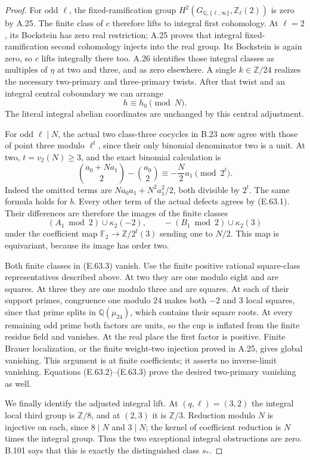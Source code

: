 \begin{proof}
For odd $\ell$, the fixed-ramification
group $H^2(G_{\mathbb Q,\{\ell,\infty\}},
\mathbb Z_\ell(2))$ is zero by A.25.
The finite class of $c$ therefore lifts
to integral first cohomology.
At $\ell=2$, its Bockstein has zero
real restriction; A.25 proves that
integral fixed-ramification second
cohomology injects into the real group.
Its Bockstein is again zero, so $c$
lifts integrally there too.
A.26 identifies those integral classes
as multiples of $\eta$ at two and three,
and as zero elsewhere. A single
$k\in\mathbb Z/24$ realizes the necessary
two-primary and three-primary twists.
After that twist and an integral central
coboundary we can arrange
\[
                        h\equiv h_0\pmod N .
 \tag{E.63.1}
\]
The literal integral abelian coordinates
are unchanged by this central adjustment.

For odd $\ell\mid N$, the actual two
class-three cocycles in B.23 now agree
with those of point three modulo
$\ell^t$, since their only binomial
denominator two is a unit.
At two, $t=v_2(N)\geq3$, and the exact
binomial calculation is
\[
 \binom{a_0+Na_1}{2}-\binom{a_0}{2}
       \equiv-\frac N2a_1\pmod{2^t}.
 \tag{E.63.2}
\]
Indeed the omitted terms are
$Na_0a_1+N^2a_1^2/2$, both divisible
by $2^t$. The same formula holds
for $b$. Every other term of the
actual defects agrees by (E.63.1).
Their differences are therefore the
images of the finite classes
\[
 (A_1\bmod2)\cup\kappa_2(-2),\qquad
 -(B_1\bmod2)\cup\kappa_2(3)
 \tag{E.63.3}
\]
under the coefficient map
$\mathbb F_2\to\mathbb Z/2^t(3)$
sending one to $N/2$. This map is
equivariant, because its image has
order two.

Both finite classes in (E.63.3) vanish.
Use the finite positive rational
square-class representatives described
above. At two they are one modulo
eight and are squares. At three they
are one modulo three and are squares.
At each of their support primes,
congruence one modulo $24$ makes
both $-2$ and $3$ local squares,
since that prime splits in
$\mathbb Q(\mu_{24})$, which contains
their square roots. At every remaining
odd prime both factors are units,
so the cup is inflated from the
finite residue field and vanishes.
At the real place the first factor
is positive. Finite Brauer localization,
or the finite weight-two injection
proved in A.25, gives global vanishing.
This argument is at finite coefficients;
it asserts no inverse-limit vanishing.
Equations (E.63.2)--(E.63.3) prove
the desired two-primary vanishing as
well.

We finally identify the adjusted
integral lift. At $(q,\ell)=(3,2)$
the integral local third group is
$\mathbb Z/8$, and at $(2,3)$ it
is $\mathbb Z/3$.
Reduction modulo $N$ is injective
on each, since $8\mid N$ and
$3\mid N$; the kernel of coefficient
reduction is $N$ times the integral
group. Thus the two exceptional
integral obstructions are zero.
B.101 says that this is exactly
the distinguished class $s_*$.


\end{proof}
